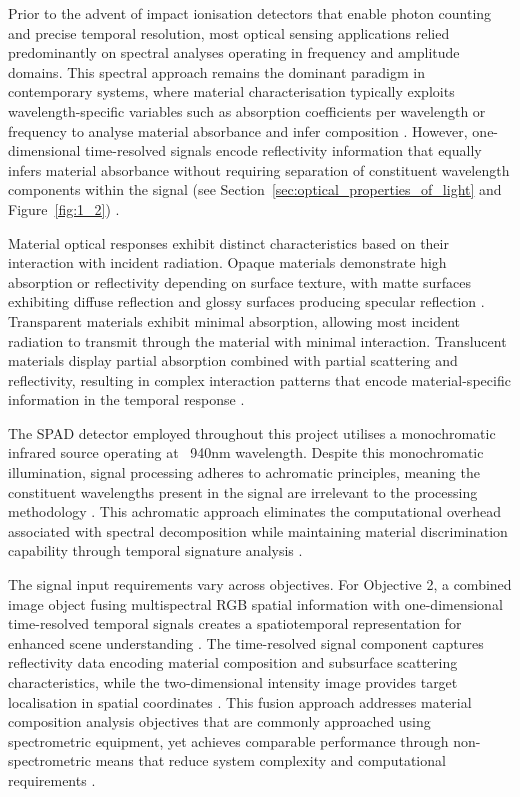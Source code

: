 \documentclass[12pt,a4paper,oneside]{report}
\begin{document}
Prior to the advent of impact ionisation detectors that enable photon counting and precise temporal resolution, most optical sensing applications relied predominantly on spectral analyses operating in frequency and amplitude domains. This spectral approach remains the dominant paradigm in contemporary systems, where material characterisation typically exploits wavelength-specific variables such as absorption coefficients per wavelength or frequency to analyse material absorbance and infer composition \cite{holt2016,elachi2021}. However, one-dimensional time-resolved signals encode reflectivity information that equally infers material absorbance without requiring separation of constituent wavelength components within the signal (see Section~\ref{sec:optical_properties_of_light} and Figure~\ref{fig:1_2}) \cite{su2016,becker2023}.

Material optical responses exhibit distinct characteristics based on their interaction with incident radiation. Opaque materials demonstrate high absorption or reflectivity depending on surface texture, with matte surfaces exhibiting diffuse reflection and glossy surfaces producing specular reflection \cite{elachi2021}. Transparent materials exhibit minimal absorption, allowing most incident radiation to transmit through the material with minimal interaction. Translucent materials display partial absorption combined with partial scattering and reflectivity, resulting in complex interaction patterns that encode material-specific information in the temporal response \cite{su2016,becker2023,tafone2023}.

The SPAD detector employed throughout this project utilises a monochromatic infrared source operating at ~940nm wavelength. Despite this monochromatic illumination, signal processing adheres to achromatic principles, meaning the constituent wavelengths present in the signal are irrelevant to the processing methodology \cite{su2016}. This achromatic approach eliminates the computational overhead associated with spectral decomposition while maintaining material discrimination capability through temporal signature analysis \cite{su2016,becker2023,tafone2023}.

The signal input requirements vary across objectives. For Objective 2, a combined image object fusing multispectral RGB spatial information with one-dimensional time-resolved temporal signals creates a spatiotemporal representation for enhanced scene understanding \cite{yang2024,moramartin2021}. The time-resolved signal component captures reflectivity data encoding material composition and subsurface scattering characteristics, while the two-dimensional intensity image provides target localisation in spatial coordinates \cite{su2016}. This fusion approach addresses material composition analysis objectives that are commonly approached using spectrometric equipment, yet achieves comparable performance through non-spectrometric means that reduce system complexity and computational requirements \cite{su2016,becker2023,tafone2023}.
\end{document}
